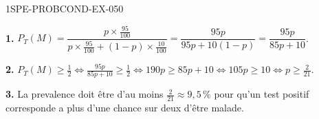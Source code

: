 \begin{corrige}{1SPE-PROBCOND-EX-050}

\textbf{1.} $P_T(M) = \dfrac{p \times \frac{95}{100}}{p \times \frac{95}{100} + (1-p) \times \frac{10}{100}} = \dfrac{95p}{95p + 10(1-p)} = \dfrac{95p}{85p + 10}$.

\textbf{2.} $P_T(M) \geq \frac{1}{2} \Leftrightarrow \frac{95p}{85p+10} \geq \frac{1}{2} \Leftrightarrow 190p \geq 85p + 10 \Leftrightarrow 105p \geq 10 \Leftrightarrow p \geq \frac{2}{21}$.

\textbf{3.} La prevalence doit être d'au moins $\frac{2}{21} \approx 9{,}5\,\%$ pour qu'un test positif corresponde a plus d'une chance sur deux d'être malade.

\end{corrige}
